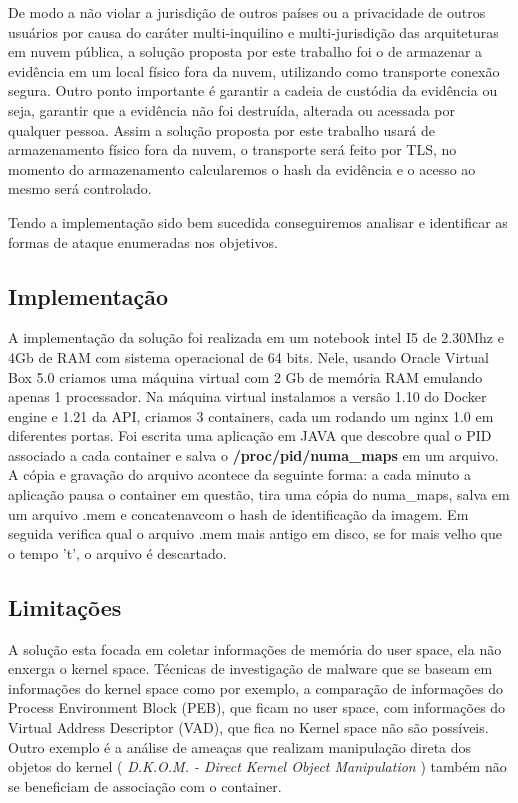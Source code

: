 \documentclass[conference]{IEEEtran}
\begin{document}
De modo a não violar a jurisdição de outros países ou a privacidade de outros usuários por causa do caráter multi-inquilino e multi-jurisdição das arquiteturas em nuvem pública, a solução proposta por este trabalho foi o de armazenar a evidência em um local físico fora da nuvem, utilizando como transporte conexão segura. 
%
Outro ponto importante é garantir a cadeia de custódia da evidência ou seja, garantir que a evidência não foi destruída, alterada ou acessada por qualquer pessoa. 
%
Assim a solução proposta por este trabalho usará de armazenamento físico fora da nuvem, o transporte será feito por TLS, no momento do armazenamento calcularemos o hash da evidência e o acesso ao mesmo será controlado.

Tendo a implementação sido bem sucedida conseguiremos analisar e identificar as formas de ataque enumeradas nos objetivos.\\

\subsection{Implementação}

A implementação da solução foi realizada em um notebook intel I5 de 2.30Mhz e 4Gb de RAM com sistema operacional de 64 bits. 
%
Nele, usando Oracle Virtual Box 5.0 criamos uma máquina virtual com 2 Gb de memória RAM emulando apenas 1 processador.
%
Na máquina virtual instalamos a versão 1.10 do Docker engine e 1.21 da API, criamos 3 containers, cada um rodando um nginx 1.0 em diferentes portas. 
%
Foi escrita uma aplicação em JAVA que descobre qual o PID associado a cada container e salva o \textbf{/proc/pid/numa\_maps} em um arquivo.
%
A cópia e gravação do arquivo acontece da seguinte forma: a cada minuto a aplicação pausa o container em questão, tira uma cópia do numa\_maps, salva em um arquivo .mem e concatenavcom o hash de identificação da imagem. 
%
Em seguida verifica qual o arquivo .mem mais antigo em disco, se for mais velho que o tempo 't', o arquivo é descartado.

\subsection{Limitações}

A solução esta focada em coletar informações de memória do user space, ela não enxerga o kernel space. 
%
Técnicas de investigação de malware que se baseam em informações do kernel space como por exemplo, a comparação de informações do Process Environment Block (PEB), que ficam no user space, com informações do Virtual Address Descriptor (VAD), que fica no Kernel space não são possíveis. 
%
Outro exemplo é a análise de ameaças que realizam manipulação direta dos objetos do kernel ( \textit{D.K.O.M. - Direct Kernel Object Manipulation} ) também não se beneficiam de associação com o container.
\end{document}
